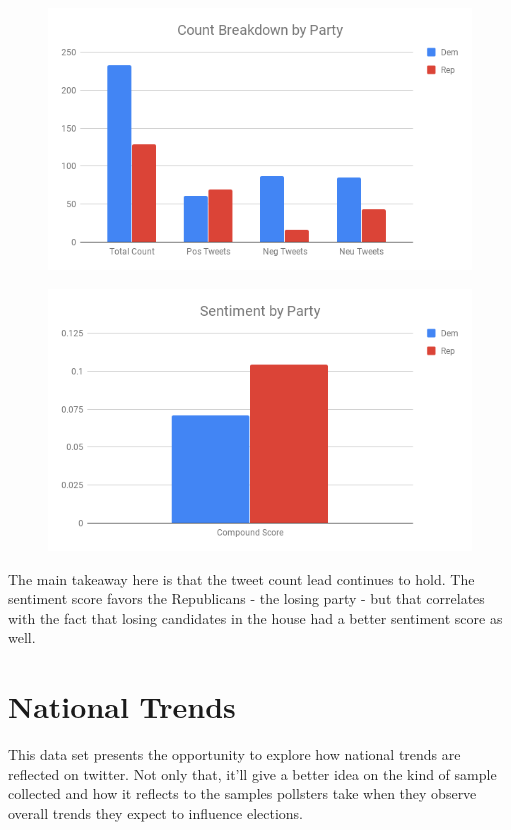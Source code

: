 \documentclass[11pt, twoside, reqno]{book}
\begin{document}
\begin{figure}[H]
\centering
	\includegraphics[scale=0.5]{count_party_house}
\end{figure}

\begin{figure}[H]
\centering
	\includegraphics[scale=0.5]{party_sent_house}
\end{figure}

The main takeaway here is that the tweet count lead continues to hold. The sentiment score favors the Republicans - the losing party - but that correlates with the fact that losing candidates in the house had a better sentiment score as well. 

\section{National Trends}
\hspace{0.2in} This data set presents the opportunity to explore how national trends are reflected on twitter. Not only that, it'll give a better idea on the kind of sample collected and how it reflects to the samples pollsters take when they observe overall trends they expect to influence elections. 
\end{document}
